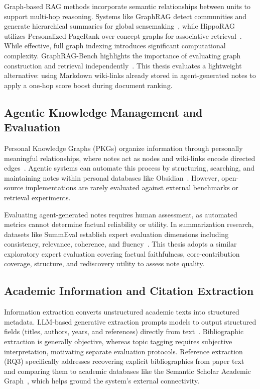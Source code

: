 \documentclass[runningheads]{llncs}
\begin{document}
Graph-based RAG methods incorporate semantic relationships between units to support multi-hop reasoning. Systems like GraphRAG detect communities and generate hierarchical summaries for global sensemaking~\cite{edge2024local}, while HippoRAG utilizes Personalized PageRank over concept graphs for associative retrieval~\cite{gutierrez2024hipporag}. While effective, full graph indexing introduces significant computational complexity. GraphRAG-Bench highlights the importance of evaluating graph construction and retrieval independently~\cite{xiao2025graphragbench}. This thesis evaluates a lightweight alternative: using Markdown wiki-links already stored in agent-generated notes to apply a one-hop score boost during document ranking.

\subsection{Agentic Knowledge Management and Evaluation}

Personal Knowledge Graphs (PKGs) organize information through personally meaningful relationships, where notes act as nodes and wiki-links encode directed edges~\cite{balog2019personal}. Agentic systems can automate this process by structuring, searching, and maintaining notes within personal databases like Obsidian~\cite{mybrainisfullcrew}. However, open-source implementations are rarely evaluated against external benchmarks or retrieval experiments.

Evaluating agent-generated notes requires human assessment, as automated metrics cannot determine factual reliability or utility. In summarization research, datasets like SummEval establish expert evaluation dimensions including consistency, relevance, coherence, and fluency~\cite{fabbri2021summeval}. This thesis adopts a similar exploratory expert evaluation covering factual faithfulness, core-contribution coverage, structure, and rediscovery utility to assess note quality.

\subsection{Academic Information and Citation Extraction}

Information extraction converts unstructured academic texts into structured metadata. LLM-based generative extraction prompts models to output structured fields (titles, authors, years, and references) directly from text~\cite{xu2024large}. Bibliographic extraction is generally objective, whereas topic tagging requires subjective interpretation, motivating separate evaluation protocols. Reference extraction (RQ3) specifically addresses recovering explicit bibliographies from paper text and comparing them to academic databases like the Semantic Scholar Academic Graph~\cite{kinney2023semantic}, which helps ground the system's external connectivity.
\end{document}
